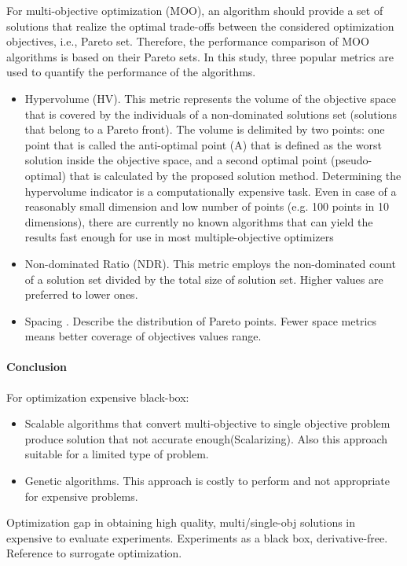             For multi-objective optimization (MOO), an algorithm should provide a set of solutions that realize the optimal trade-offs between the considered optimization objectives, i.e., Pareto set. Therefore, the performance comparison of MOO algorithms is based on their Pareto sets. In this study, three popular metrics are used to quantify the performance of the algorithms. 
            \begin{itemize}
                \item Hypervolume (HV)\cite{Zitzler2000ComparisonOM}. 
                This metric represents the volume of the objective space that is covered by the individuals of a non-dominated solutions set (solutions that belong to a Pareto front). The volume is delimited by two points: one point that is called the anti-optimal point (A) that is defined as the worst solution inside the objective space, and a second optimal point (pseudo-optimal) that is calculated by the proposed solution method. 
                Determining the hypervolume indicator is a computationally expensive task. Even in case of a reasonably small dimension and low number of points (e.g. 100 points in 10 dimensions), 
                there are currently no known algorithms that can yield the results fast enough for use in most multiple-objective optimizers
                \item Non-dominated Ratio (NDR). This metric employs the non-dominated count of a solution set divided by the total size of solution set. Higher values are preferred to lower ones.
                \item Spacing \cite{Schott1995FaultTD}. Describe the distribution of Pareto points. Fewer space metrics means better coverage of objectives values range.
                
            \end{itemize}

        \paragraph{Conclusion}

            For optimization expensive black-box:
            \begin{itemize}
                \item Scalable algorithms that convert multi-objective to single objective problem produce solution that not accurate enough(Scalarizing). Also this approach suitable for a limited type of problem.
                \item Genetic algorithms. This approach is costly to perform and not appropriate for expensive problems.
            \end{itemize}
            Optimization gap in obtaining high quality, multi/single-obj solutions in expensive to evaluate experiments.
            Experiments as a black box, derivative-free. Reference to surrogate optimization.


